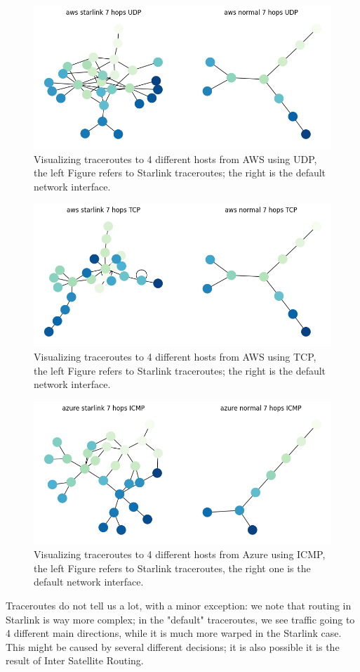 \documentclass[IN,11pt,twoside,openright,idp,english]{tumthesis}
\begin{document}
\begin{figure}
    \label{fig:tr_aws_udp}
    \centering
    \includegraphics[width=0.6\columnwidth]{img/tr_aws_udp.png}
    \caption{Visualizing traceroutes to 4 different hosts from AWS using UDP, the left Figure refers to Starlink traceroutes; the right is the default network interface.}
\end{figure}
    
\begin{figure}
    \label{fig:tr_aws_tcp}
    \centering
    \includegraphics[width=0.6\columnwidth]{img/tr_aws_tcp.png}
    \caption{Visualizing traceroutes to 4 different hosts from AWS using TCP, the left Figure refers to Starlink traceroutes; the right is the default network interface.}
\end{figure}
    
\begin{figure}
    \label{fig:tr_azure_icmp}
    \centering
    \includegraphics[width=0.6\columnwidth]{img/tr_azure_icmp.png}
    \caption{Visualizing traceroutes to 4 different hosts from Azure using ICMP, the left Figure refers to Starlink traceroutes, the right one is the default network interface.}
\end{figure}
    
Traceroutes do not tell us a lot, with a minor exception: we note that routing in Starlink is way more complex; in the "default" traceroutes, we see traffic going to 4 different main directions, while it is much more warped in the Starlink case. This might be caused by several different decisions; it is also possible it is the result of Inter Satellite Routing. 
\end{document}
